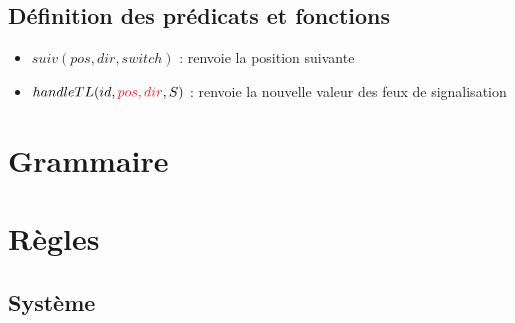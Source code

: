 \documentclass[12pt]{article}
\begin{document}
\subsection{Définition des prédicats et fonctions}

\begin{itemize}
    \item $suiv(pos, dir, switch)$ : renvoie la position suivante 
    \item $handleTL(id, {\color{Red}pos, dir}, S)$ : renvoie la nouvelle valeur des feux de signalisation 
\end{itemize}


\section{Grammaire}



\begin{grammar}
    \otherform{\varepsilon }{}
\end{grammar}

\vspace{0.5cm}

\begin{grammar}
    \otherform{\varepsilon}{}

\end{grammar}


\newpage
\section{Règles}

\subsection{Système}
\end{document}
